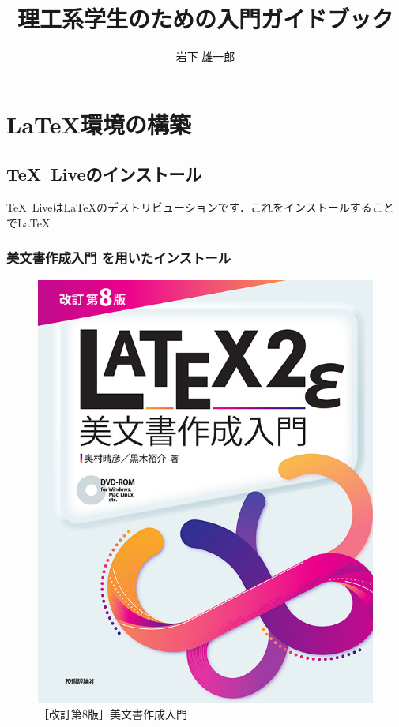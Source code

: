 \documentclass[a4paper,dvipdfmx]{jsreport}
\title{理工系学生のための\LaTeXe 入門ガイドブック}
\author{岩下 雄一郎}
\begin{document}
\maketitle
\tableofcontents

\newpage

\part{\LaTeX 環境の構築}
\chapter{\TeX\ Liveのインストール}
\TeX\ Liveは\LaTeX のデストリビューションです．これをインストールすることで\LaTeX 

\section{\LaTeXe 美文書作成入門 を用いたインストール}
\begin{figure}[hbtp]
    \centering
    \includegraphics[scale=0.18]{fig_bibunsho.jpg}
    \caption{［改訂第8版］\LaTeXe 美文書作成入門}
    \label{fig:bibunsho}
\end{figure}
\end{document}
